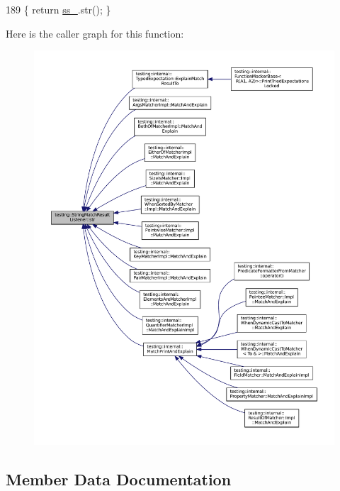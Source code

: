 \begin{DoxyCode}
189 \{ \textcolor{keywordflow}{return} \hyperlink{classtesting_1_1StringMatchResultListener_a91649df8349c441ce8963271d0633f3e}{ss\_}.str(); \}
\end{DoxyCode}
Here is the caller graph for this function\+:
\nopagebreak
\begin{figure}[H]
\begin{center}
\leavevmode
\includegraphics[width=350pt]{classtesting_1_1StringMatchResultListener_ad1ed3c6b1077cc76b67567b33f5a2bd1_icgraph}
\end{center}
\end{figure}


\subsection{Member Data Documentation}
\mbox{\label{classtesting_1_1StringMatchResultListener_a91649df8349c441ce8963271d0633f3e}} 
